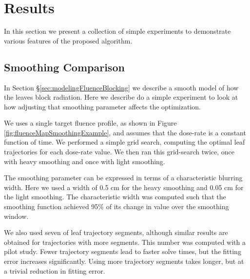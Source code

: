 \section{Results}

In this section we present a collection of simple experiments to demonstrate various features of the
proposed algorithm.


\subsection{Smoothing Comparison}
\label{sec:LeafSmoothingComparison}

In Section \S\ref{sec:modelingFluenceBlocking} we describe a smooth model of how the leaves block radiation.
Here we describe do a simple experiment to look at how adjusting that smoothing parameter affects the optimization.

We uses a single target fluence profile, as shown in Figure \ref{fig:fluenceMapSmoothingExample},
and assumes that the dose-rate is a constant function of time.
We performed a simple grid search, computing the optimal leaf trajectories for each dose-rate value.
We then ran this grid-search twice, once with heavy smoothing and once with light smoothing.

The smoothing parameter can be expressed in terms of a characteristic blurring width.
Here we used a width of 0.5 cm for the heavy smoothing and 0.05 cm for the light smoothing.
The characteristic width was computed such that the smoothing function achieved 95\% of its
change in value over the smoothing window.

We also used seven of leaf trajectory segments, although similar results are obtained for trajectories with more segments.
This number was computed with a pilot study.
Fewer trajectory segments lead to faster solve times, but the fitting error increases significantly.
Using more trajectory segments takes longer, but at a trivial reduction in fitting error.

